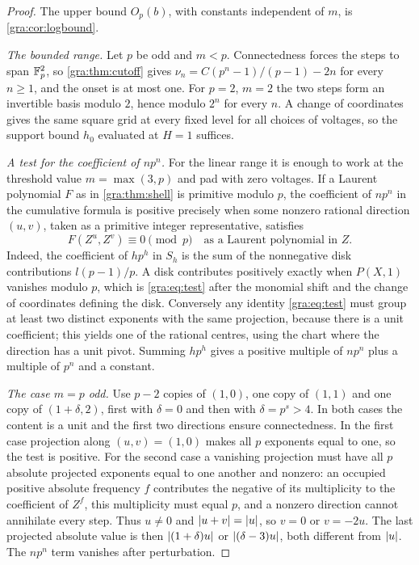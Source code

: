 \begin{proof}
The upper bound $O_p(b)$, with constants independent of $m$, is
\cref{gra:cor:logbound}.

\emph{The bounded range.} Let $p$ be odd and $m<p$. Connectedness forces
the steps to span $\mathbb{F}_p^2$, so \cref{gra:thm:cutoff} gives
$\nu_n=C(p^n-1)/(p-1)-2n$ for every $n\ge1$, and the onset is at most
one. For $p=2$, $m=2$ the two steps
form an invertible basis modulo $2$, hence modulo $2^n$ for every $n$. A
change of coordinates gives the same square grid at every fixed level for
all choices of voltages, so the support bound $h_0$ evaluated at $H=1$
suffices.

\emph{A test for the coefficient of $np^n$.} For the linear range it is
enough to work at the threshold value $m=\max(3,p)$ and pad with zero
voltages. If a Laurent polynomial $F$ as in \cref{gra:thm:shell} is
primitive modulo $p$, the coefficient of $np^n$ in the cumulative formula
is positive precisely when some nonzero rational direction $(u,v)$, taken
as a primitive integer representative, satisfies
\begin{equation}\label{gra:eq:test}
 F(Z^u,Z^v)\equiv0\pmod p\quad\text{as a Laurent polynomial in }Z .
\end{equation}
Indeed, the coefficient of $hp^h$ in $S_h$ is the sum of the nonnegative
disk contributions $l(p-1)/p$. A disk contributes positively exactly when
$P(X,1)$ vanishes modulo $p$, which is \eqref{gra:eq:test} after the
monomial shift and the change of coordinates defining the disk. Conversely
any identity \eqref{gra:eq:test} must group at least two distinct
exponents with the same projection, because there is a unit coefficient;
this yields one of the rational centres, using the chart where the
direction has a unit pivot. Summing $hp^h$ gives a positive multiple of
$np^n$ plus a multiple of $p^n$ and a constant.

\emph{The case $m=p$ odd.} Use $p-2$ copies of $(1,0)$, one copy of
$(1,1)$ and one copy of $(1+\delta,2)$, first with $\delta=0$ and then
with $\delta=p^s>4$. In both cases the content is a unit and the first two
directions ensure connectedness. In the first case projection along
$(u,v)=(1,0)$ makes all $p$ exponents equal to one, so the test is
positive. For the second case a vanishing projection must have all $p$
absolute projected exponents equal to one another and nonzero: an occupied
positive absolute frequency $f$ contributes the negative of its
multiplicity to the coefficient of $Z^f$, this multiplicity must equal
$p$, and a nonzero direction cannot annihilate every step. Thus $u\ne0$
and $\lvert u+v\rvert=\lvert u\rvert$, so $v=0$ or $v=-2u$. The last projected absolute
value is then $\lvert(1+\delta)u\rvert$ or $\lvert(\delta-3)u\rvert$, both different
from $\lvert u\rvert$. The $np^n$ term vanishes after perturbation.


\end{proof}
